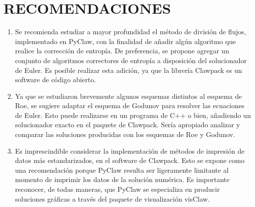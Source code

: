 \chapter{RECOMENDACIONES}
\begin{enumerate}
	\item Se recomienda estudiar a mayor profundidad el método de división de flujos, implementado en PyClaw, con la finalidad de añadir algún algoritmo que realice la corrección de entropía. De preferencia, se propone agregar un conjunto de algoritmos correctores de entropía a disposición del solucionador de Euler. Es posible realizar esta adición, ya que la librería Clawpack es un software de código abierto.
	\item Ya que se estudiaron brevemente algunos esquemas distintos al esquema de Roe, se sugiere adaptar el esquema de Godunov para resolver las ecuaciones de Euler. Esto puede realizarse en un programa de C++ o bien, añadiendo un solucionador exacto en el paquete de Clawpack. Sería apropiado analizar y comparar las soluciones producidas con los esquemas de Roe y Godunov.
	\item Es imprescindible considerar la implementación de métodos de impresión de datos más estandarizados, en el software de Clawpack. Esto se expone como una recomendación porque PyClaw resulta ser ligeramente limitante al momento de imprimir los datos de la solución numérica. Es importante reconocer, de todas maneras, que PyClaw se especializa en producir soluciones gráficas a través del paquete de visualización visClaw.
\end{enumerate}
